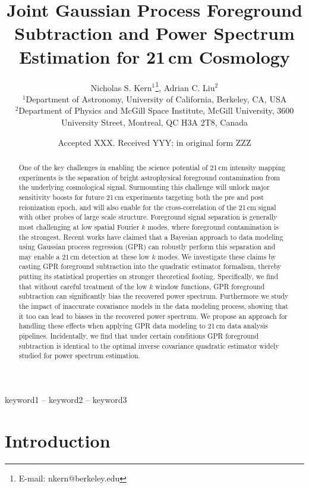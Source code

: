 \documentclass[a4paper,fleqn,usenatbib]{mnras}
\title[Joint Gaussian Process Foreground Subtraction and Power Spectrum Estimation]
{Joint Gaussian Process Foreground Subtraction and Power Spectrum Estimation for 21\,cm Cosmology}
\author[N. S. Kern \& A. C. Liu]{
Nicholas S. Kern$^{1}$\thanks{E-mail: nkern@berkeley.edu},
Adrian C. Liu$^{2}$
\\
$^{1}$Department of Astronomy, University of California, Berkeley, CA, USA\\
$^{2}$Department of Physics and McGill Space Institute, McGill University, 3600 University Street, Montreal, QC H3A 2T8, Canada
}
\date{Accepted XXX. Received YYY; in original form ZZZ}
\begin{document}
\label{firstpage}
\pagerange{\pageref{firstpage}--\pageref{lastpage}}
\maketitle

\begin{abstract}
One of the key challenges in enabling the science potential of 21\,cm intensity mapping experiments is the separation of bright astrophysical foreground contamination from the underlying cosmological signal.
Surmounting this challenge will unlock major sensitivity boosts for future 21\,cm experiments targeting both the pre and post reionization epoch, and will also enable for the cross-correlation of the 21\,cm signal with other probes of large scale structure.
Foreground signal separation is generally most challenging at low spatial Fourier $k$ modes, where foreground contamination is the strongest.
Recent works have claimed that a Bayesian approach to data modeling using Gaussian process regression (GPR) can robustly perform this separation and may enable a 21\,cm detection at these low $k$ modes.
We investigate these claims by casting GPR foreground subtraction into the quadratic estimator formalism, thereby putting its statistical properties on stronger theoretical footing.
Specifically, we find that without careful treatment of the low $k$ window functions, GPR foreground subtraction can significantly bias the recovered power spectrum.
Furthermore we study the impact of inaccurate covariance models in the data modeling process, showing that it too can lead to biases in the recovered power spectrum.
We propose an approach for handling these effects when applying GPR data modeling to 21\,cm data analysis pipelines.
Incidentally, we find that under certain conditions GPR foreground subtraction is identical to the optimal inverse covariance quadratic estimator widely studied for power spectrum estimation.
\end{abstract}

\begin{keywords}
keyword1 -- keyword2 -- keyword3
\end{keywords}



\section{Introduction}
\label{sec:intro}
\end{document}
